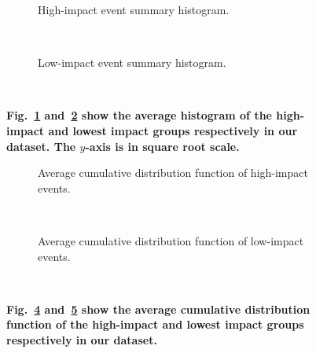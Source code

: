 \documentclass[10pt,letterpaper]{article}
\newcommand{\newtext}[1]{{\leavevmode\color{blue}#1}}
\begin{document}

\begin{figure}
  \centering
  \begin{subfigure}{\textwidth}
    \caption{High-impact event summary histogram. %
    }
    \label{fig:highest}
  \end{subfigure}%

  ~%
  \begin{subfigure}{\textwidth}
    \caption{Low-impact event summary histogram. %
    }
    \label{fig:low}
  \end{subfigure}%
  ~ %

  \caption{\textbf{Fig.~\ref{fig:highest} and~\ref{fig:low} show the average
    histogram of the high-impact and lowest impact groups respectively in our dataset. The $y$-axis is in square root
      scale.
    }}\label{fig:histograms}
\end{figure}
\begin{figure}
  \centering
  \begin{subfigure}{.5\textwidth}
    \caption{Average cumulative distribution function of high-impact events. %
    }
    \label{fig:cdf-highest}
  \end{subfigure}%
  ~%
  \begin{subfigure}{.5\textwidth}
    \caption{Average cumulative distribution function of low-impact events. %
    }
    \label{fig:cdf-lowest}
  \end{subfigure}%
  ~ %

  \caption{\textbf{%
        Fig.~\ref{fig:cdf-highest} and~\ref{fig:cdf-lowest} show the average
    cumulative distribution function of the high-impact and lowest impact groups respectively in our dataset. %
    }}\label{fig:cdfs}
\end{figure}
\end{document}
